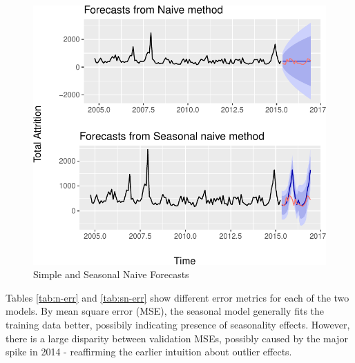 \documentclass[12pt,letterpaper,toc=flat,oneside]{report}
\theoremstyle{definition}
\theoremstyle{definition}
\theoremstyle{definition}
\theoremstyle{remark}
\begin{document}
\begin{figure}[H]

{\centering \includegraphics{elliott-econometric-personnel-retention-18_files/figure-latex/n-sn-forecast-1} 

}

\caption{Simple and Seasonal Naive Forecasts}\label{fig:n-sn-forecast}
\end{figure}

Tables \ref{tab:n-err} and \ref{tab:sn-err} show different error metrics
for each of the two models. By mean square error (MSE), the seasonal
model generally fits the training data better, possibily indicating
presence of seasonality effects. However, there is a large disparity
between validation MSEs, possibly caused by the major spike in 2014 -
reaffirming the earlier intuition about outlier effects.
\end{document}
